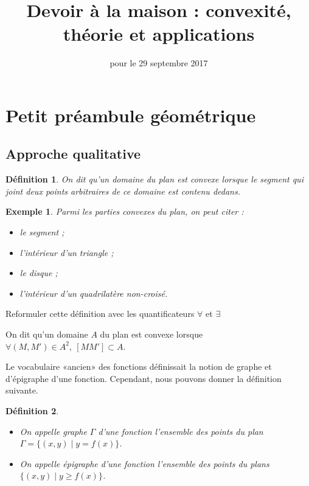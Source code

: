 \documentclass[12pt,a4paper,french]{article}
\title{Devoir à la maison \no{1} : convexité, théorie et applications}
\author{\bsc{Ts 2}}
\date{pour le 29 septembre 2017}
\makeatletter
\renewcommand{\maketitle}%
{\framebox{%
    \begin{minipage}{1.0\linewidth}%
      \begin{center}%
        \Large \@title ~-- \@author \\%
        \@date%
      \end{center}%
    \end{minipage}}%
  \normalsize%
}
\theoremstyle{break}
\newtheorem{definition}{Définition}
\theoremstyle{plain}
\theoremstyle{nonumberplain}
\theoremstyle{nonumberbreak}
\newtheorem{exemple}{Exemple}
\makeatother
\begin{document}
\maketitle

\section{Petit préambule géométrique}

\subsection{Approche qualitative}

\begin{definition}
  On dit qu'un domaine du plan est convexe lorsque le segment qui joint
  deux points arbitraires de ce domaine est contenu dedans.
\end{definition}

\begin{exemple}
  Parmi les parties convexes du plan, on peut citer :
  \begin{itemize}
    \item le segment ;
    \item l'intérieur d'un triangle ;
    \item le disque ;
    \item l'intérieur d'un quadrilatère non-croisé.
  \end{itemize}
\end{exemple}

\begin{question}[ID=reformulation]
  Reformuler cette définition avec les quantificateurs $\forall$ et
  $\exists$
\end{question}
\begin{solution}
  On dit qu'un domaine $A$ du plan est convexe lorsque $\forall (M,M')
  \in A^2,\ [MM']\subset A$.
\end{solution}

Le vocabulaire «ancien» des fonctions définissait la notion de graphe et
d'épigraphe d'une fonction. Cependant, nous pouvons donner la définition
suivante.
\begin{definition}
  \begin{itemize}
    \item On appelle graphe $\Gamma$ d'une fonction l'ensemble des
      points du plan $\Gamma = \lbrace (x,y) \mid y = f(x) \rbrace$.
    \item On appelle épigraphe d'une fonction l'ensemble des points du
      plans $\lbrace (x,y) \mid y \geqslant f(x)\rbrace$.
  \end{itemize}
\end{definition}
\end{document}
